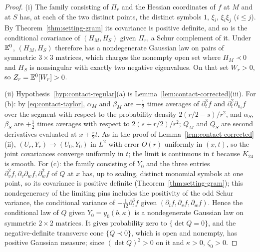 \begin{proof}
(i) The family consisting of $\Pi_r$ and the Hessian coordinates of $f$ at $M$ and at $S$ has, at each of the two distinct points, the distinct symbols $1$, $\xi_i$, $\xi_i\xi_j$ ($i\le j$). By Theorem~\ref{thm:setting-gram} its covariance is positive definite, and so is the conditional covariance of $(H_M,H_S)$ given $\Pi_r$, a Schur complement of it. Under $\mathbb E^0$, $(H_M,H_S)$ therefore has a nondegenerate Gaussian law on pairs of symmetric $3\times3$ matrices, which charges the nonempty open set where $H_M\prec0$ and $H_S$ is nonsingular with exactly two negative eigenvalues. On that set $W_r>0$, so $Z_r=\mathbb E^0[W_r]>0$.

(ii) Hypothesis~\ref{hyp:contact-regular}(a) is Lemma~\ref{lem:contact-corrected}(iii). For (b): by \eqref{eq:contact-taylor}, $\alpha_M$ and $\beta_M$ are $-\frac12$ times averages of $\partial_t^3f$ and $\partial_t^2\partial_{n_i}f$ over the segment with respect to the probability density $2(r/2-s)/r^2$, and $\alpha_S$, $\beta_S$ are $+\frac12$ times averages with respect to $2(s+r/2)/r^2$; $Q_M$ and $Q_S$ are second derivatives evaluated at $x\mp\frac r2t$. As in the proof of Lemma~\ref{lem:contact-corrected}(ii), $(U_r,Y_r)\to(U_0,Y_0)$ in $L^2$ with error $O(r)$ uniformly in $(x,t)$, so the joint covariances converge uniformly in $t$; the limit is continuous in $t$ because $K_{24}$ is smooth. For (c): the family consisting of $Y_0$ and the three entries $\partial_v^2f,\partial_v\partial_wf,\partial_w^2f$ of $Q$ at $x$ has, up to scaling, distinct monomial symbols at one point, so its covariance is positive definite (Theorem~\ref{thm:setting-gram}); this nondegeneracy of the limiting pins includes the positivity of the odd Schur variance, the conditional variance of $-\frac1{12}\partial_t^3f$ given $(\partial_tf,\partial_vf,\partial_wf)$. Hence the conditional law of $Q$ given $Y_0=y_0(b,\kappa)$ is a nondegenerate Gaussian law on symmetric $2\times2$ matrices. It gives probability zero to $\{\det Q=0\}$, and the negative-definite transverse cone $\{Q\prec0\}$, which is open and nonempty, has positive Gaussian measure; since $(\det Q)^2>0$ on it and $\kappa>0$, $\zeta_0>0$.


\end{proof}
